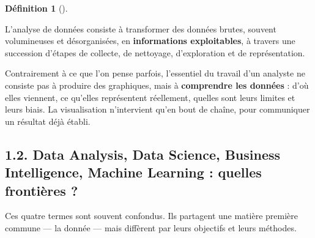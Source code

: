 \documentclass[
  french,
  letterpaper,
  open=any]{scrbook}
\theoremstyle{definition}
\newtheorem{definition}{Définition}[section]
\theoremstyle{definition}
\theoremstyle{remark}
\begin{document}
\begin{tcolorbox}[enhanced jigsaw, arc=.35mm, bottomrule=.15mm, bottomtitle=1mm, breakable, colback=white, colbacktitle=quarto-callout-tip-color!10!white, colframe=quarto-callout-tip-color-frame, coltitle=black, left=2mm, leftrule=.75mm, opacityback=0, opacitybacktitle=0.6, rightrule=.15mm, title=\textcolor{quarto-callout-tip-color}{\faLightbulb}\hspace{0.5em}{Analyse de données}, titlerule=0mm, toprule=.15mm, toptitle=1mm]

\begin{definition}[]\protect\hypertarget{def-analyse-donnees}{}\label{def-analyse-donnees}

L'analyse de données consiste à transformer des données brutes, souvent
volumineuses et désorganisées, en \textbf{informations exploitables}, à
travers une succession d'étapes de collecte, de nettoyage, d'exploration
et de représentation.

\end{definition}

\end{tcolorbox}

Contrairement à ce que l'on pense parfois, l'essentiel du travail d'un
analyste ne consiste pas à produire des graphiques, mais à
\textbf{comprendre les données} : d'où elles viennent, ce qu'elles
représentent réellement, quelles sont leurs limites et leurs biais. La
visualisation n'intervient qu'en bout de chaîne, pour communiquer un
résultat déjà établi.

\subsection{1.2. Data Analysis, Data Science, Business Intelligence,
Machine Learning : quelles frontières
?}\label{data-analysis-data-science-business-intelligence-machine-learning-quelles-frontiuxe8res}

Ces quatre termes sont souvent confondus. Ils partagent une matière
première commune --- la donnée --- mais diffèrent par leurs objectifs et
leurs méthodes.
\end{document}
